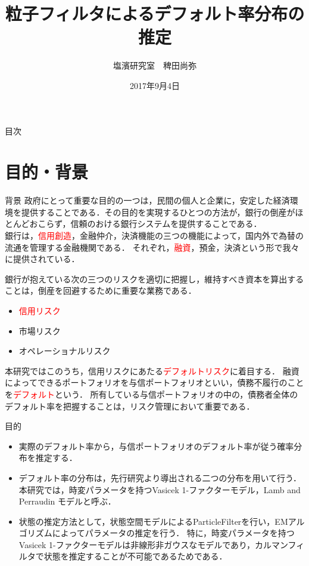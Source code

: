 \documentclass[dvipdfmx]{beamer}
\title[タイトル]{粒子フィルタによるデフォルト率分布の推定}
\author[発表者名]{塩濱研究室　稗田尚弥}
\institute[所属]{東京理科大学大学院工学研究科経営工学専攻1年 \\ 学籍番号 4417621}
\date[日付]{2017年9月4日}
\begin{document}
\begin{frame}[plain]
\titlepage
\end{frame}


\begin{frame}{目次}
\tableofcontents
\end{frame}

\section{目的・背景}
\begin{frame}{背景}
政府にとって重要な目的の一つは，民間の個人と企業に，安定した経済環境を提供することである．その目的を実現するひとつの方法が，銀行の倒産がほとんどおこらず，信頼のおける銀行システムを提供することである．\\
銀行は，\textcolor{red}{信用創造}，金融仲介，決済機能の三つの機能によって，国内外で為替の流通を管理する金融機関である．
それぞれ，\textcolor{red}{融資}，預金，決済という形で我々に提供されている．\\
\end{frame}

\begin{frame}
銀行が抱えている次の三つのリスクを適切に把握し，維持すべき資本を算出することは，倒産を回避するために重要な業務である．
\begin{block}{}
\begin{itemize}
 \item \textcolor{red}{信用リスク} 
 \item 市場リスク 
 \item オペレーショナルリスク 
\end{itemize}
\end{block}
本研究ではこのうち，信用リスクにあたる\textcolor{red}{デフォルトリスク}に着目する．
融資によってできるポートフォリオを与信ポートフォリオといい，債務不履行のことを\textcolor{red}{デフォルト}という．
所有している与信ポートフォリオの中の，債務者全体のデフォルト率を把握することは，リスク管理において重要である．
\end{frame}

\begin{frame}{目的}
\begin{itemize}
\item
実際のデフォルト率から，与信ポートフォリオのデフォルト率が従う確率分布を推定する．
\item
デフォルト率の分布は，先行研究より導出される二つの分布を用いて行う．本研究では，時変パラメータを持つVasicek 1-ファクターモデル，Lamb and Perraudin モデルと呼ぶ．
\item
状態の推定方法として，状態空間モデルによるParticleFilterを行い，EMアルゴリズムによってパラメータの推定を行う．
特に，時変パラメータを持つVasicek 1-ファクターモデルは非線形非ガウスなモデルであり，カルマンフィルタで状態を推定することが不可能であるためである．
\end{itemize}
\end{frame}
\end{document}
